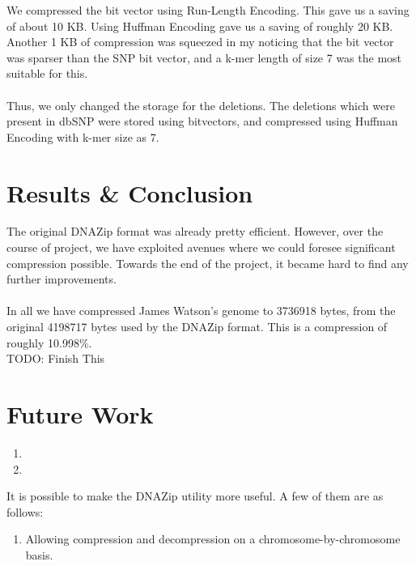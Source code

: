 \documentclass{article}
\begin{document}
We compressed the bit vector using Run-Length Encoding. This gave us a saving of about 10 KB. Using Huffman Encoding gave us a saving of roughly 20 KB. Another 1 KB of compression was squeezed in my noticing that the bit vector was sparser than the SNP bit vector, and a k-mer length of size 7 was the most suitable for this.\\ 
\\
Thus, we only changed the storage for the deletions. The deletions which were present in dbSNP were stored using bitvectors, and compressed using Huffman Encoding with k-mer size as 7.
\clearpage

\section {Results \& Conclusion}
The original DNAZip format was already pretty efficient. However, over the course of project, we have exploited avenues where we could foresee significant compression possible. Towards the end of the project, it became hard to find any further improvements.\\
\\
In all we have compressed James Watson's genome to 3736918 bytes, from the original 4198717 bytes used by the DNAZip format. This is a compression of roughly 10.998\%. \\

TODO: Finish This
\clearpage

\section {Future Work}

\begin{enumerate}
\item 
\item 

\end{enumerate}

It is possible to make the DNAZip utility more useful. A few of them are as follows:

\begin{enumerate}
\item Allowing compression and decompression on a chromosome-by-chromosome basis.
\end{enumerate}

\clearpage
\end{document}
